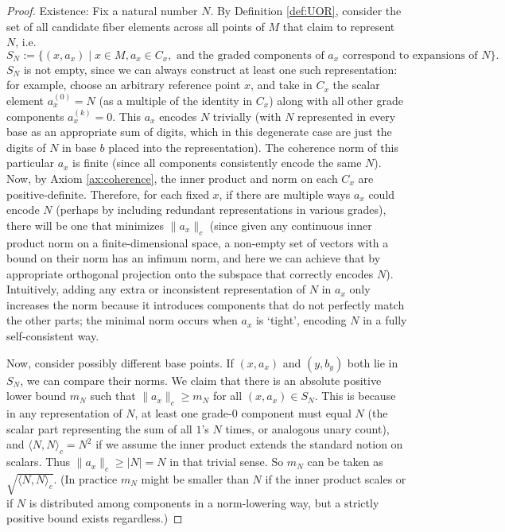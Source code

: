 \documentclass[11pt]{article}
\begin{document}
\begin{proof}
Existence: Fix a natural number $N$. By Definition \ref{def:UOR}, consider the set of all candidate fiber elements across all points of $M$ that claim to represent $N$, i.e. 
\[ S_N := \{(x, a_x) \mid x \in M, a_x \in C_x, \text{ and the graded components of } a_x \text{ correspond to expansions of } N\}. \] 
$S_N$ is not empty, since we can always construct at least one such representation: for example, choose an arbitrary reference point $x$, and take in $C_x$ the scalar element $a_x^{(0)} = N$ (as a multiple of the identity in $C_x$) along with all other grade components $a_x^{(k)}=0$. This $a_x$ encodes $N$ trivially (with $N$ represented in every base as an appropriate sum of digits, which in this degenerate case are just the digits of $N$ in base $b$ placed into the representation). The coherence norm of this particular $a_x$ is finite (since all components consistently encode the same $N$). Now, by Axiom \ref{ax:coherence}, the inner product and norm on each $C_x$ are positive-definite. Therefore, for each fixed $x$, if there are multiple ways $a_x$ could encode $N$ (perhaps by including redundant representations in various grades), there will be one that minimizes $\|a_x\|_c$ (since given any continuous inner product norm on a finite-dimensional space, a non-empty set of vectors with a bound on their norm has an infimum norm, and here we can achieve that by appropriate orthogonal projection onto the subspace that correctly encodes $N$). Intuitively, adding any extra or inconsistent representation of $N$ in $a_x$ only increases the norm because it introduces components that do not perfectly match the other parts; the minimal norm occurs when $a_x$ is `tight', encoding $N$ in a fully self-consistent way.

Now, consider possibly different base points. If $(x, a_x)$ and $(y, b_y)$ both lie in $S_N$, we can compare their norms. We claim that there is an absolute positive lower bound $m_N$ such that $\|a_x\|_c \ge m_N$ for all $(x,a_x) \in S_N$. This is because in any representation of $N$, at least one grade-$0$ component must equal $N$ (the scalar part representing the sum of all $1$'s $N$ times, or analogous unary count), and $\langle N, N \rangle_c = N^2$ if we assume the inner product extends the standard notion on scalars. Thus $\|a_x\|_c \ge |N| = N$ in that trivial sense. So $m_N$ can be taken as $\sqrt{\langle N, N\rangle_c}$. (In practice $m_N$ might be smaller than $N$ if the inner product scales or if $N$ is distributed among components in a norm-lowering way, but a strictly positive bound exists regardless.)


\end{proof}
\end{document}
